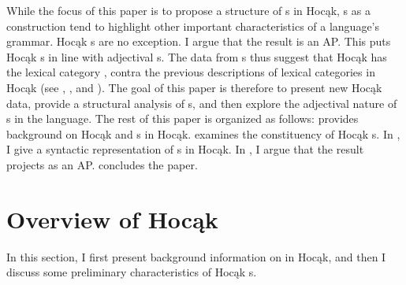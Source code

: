 \documentclass[output=paper]{LSP/langsci}
\begin{document}
\begin{exe}
\ex\label{ex:rosen:2}
{\hspace{1em}}\newline
{}
\end{exe}
 
While the focus of this paper is to propose a structure of s in Hocąk, s as a construction tend to highlight other important characteristics of a language's grammar. Hocąk s are no exception. I argue that the result  is an AP. This puts Hocąk s in line with  adjectival s. The data from s
thus suggest that Hocąk has the lexical category , contra the previous descriptions of lexical categories in Hocąk (see \citealt{Lipkind1945}, \citealt{Susman1943}, and \citealt{Helmbrecht2006b}). The goal of this paper is therefore to present new Hocąk data, provide a structural analysis of s, and then explore the adjectival nature of  s in the language. The rest of this paper is organized as follows:  provides background on Hocąk  and s in Hocąk.  examines the constituency of Hocąk s. In , I give a syntactic representation of s in Hocąk. In , I argue that the result  projects as an AP.  concludes the paper.

\section{Overview of Hocąk }\label{sec:rosen:2}

In this section, I first present background information on  in Hocąk, and then I discuss some preliminary characteristics of Hocąk s.
 
\end{document}
